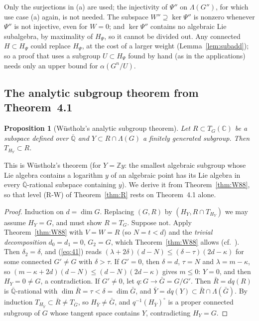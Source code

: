 \documentclass[11pt]{amsart}
\newtheorem{proposition}[theorem]{Proposition}
\theoremstyle{definition}
\newcommand{\Qb}{\overline{\mathbb{Q}}}
\newcommand{\C}{\mathbb{C}}
\newcommand{\Z}{\mathbb{Z}}
\begin{document}
\noindent Only the surjections in (a) are used; the injectivity of $\Psi''$ on $\Lambda(G'')$, for which \cite[p.~364]{RW93}
use case (a) again, is not needed. The subspace $W''\supseteq\ker\Psi''$ is nonzero whenever $\Psi''$ is not injective, even
for $W=0$; and $\ker\Psi''$ contains no algebraic Lie subalgebra, by maximality of $H_\Psi$, so it cannot be divided out.
Any connected $H\subset H_\Psi$ could replace $H_\Psi$, at the cost of a larger weight (Lemma~\ref{lem:subadd}); so a proof
that uses a subgroup $U\subset H_\Psi$ found by hand (as in the applications) needs only an upper bound for $\alpha(G^n/U)$.

\subsection{The analytic subgroup theorem from Theorem~4.1}\label{sec:wue}

\begin{proposition}[W\"ustholz's analytic subgroup theorem]\label{prop:wue}
Let $R\subset T_G(\C)$ be a subspace defined over $\Qb$ and $Y\subset R\cap\Lambda(G)$ a finitely generated subgroup. Then
$T_{H_Y}\subset R$.
\end{proposition}

\noindent This is W\"ustholz's theorem \cite{Wu89} (for $Y=\Z y$: the smallest algebraic subgroup whose Lie algebra contains a
logarithm $y$ of an algebraic point has its Lie algebra in every $\Qb$-rational subspace containing $y$). We derive it from
Theorem~\ref{thm:W88}, so that level (R-W) of Theorem~\ref{thm:R} rests on Theorem~4.1 alone.

\begin{proof}
Induction on $d=\dim G$. Replacing $(G,R)$ by $(H_Y,R\cap T_{H_Y})$ we may assume $H_Y=G$, and must show $R=T_G$. Suppose
not. Apply Theorem~\ref{thm:W88} with $V=W=R$ (so $N=t<d$) and the \emph{trivial decomposition} $d_0=d_1=0$, $G_2=G$, which
Theorem~\ref{thm:W88} allows (cf.\ \cite[pp.~636--637]{W83}). Then $\delta_2=\delta$, and (\ref{eq:41}) reads
$(\lambda+2\delta)(d-N)\le(\delta-\tau)(2d-\kappa)$ for some connected $G'\ne G$ with $\delta>\tau$. If $G'=0$, then
$\delta=d$, $\tau=N$ and $\lambda=m-\kappa$, so $(m-\kappa+2d)(d-N)\le(d-N)(2d-\kappa)$ gives $m\le0$: $Y=0$, and then
$H_Y=0\ne G$, a contradiction. If $G'\ne0$, let $q\colon G\to\bar G=G/G'$. Then $\bar R=dq(R)$ is $\Qb$-rational with
$\dim\bar R=\tau<\delta=\dim\bar G$, and $\bar Y=dq(Y)\subset\bar R\cap\Lambda(\bar G)$. By induction $T_{H_{\bar Y}}\subset\bar R
\ne T_{\bar G}$, so $H_{\bar Y}\ne\bar G$, and $q^{-1}(H_{\bar Y})^\circ$ is a proper connected subgroup of $G$ whose tangent
space contains $Y$, contradicting $H_Y=G$.
\end{proof}
\end{document}
